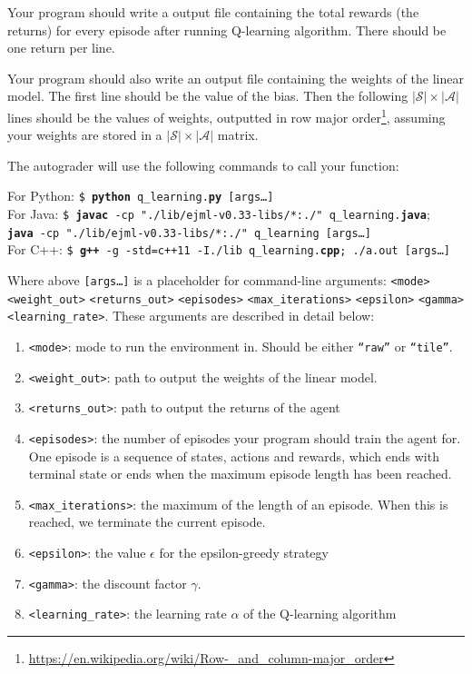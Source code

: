 Your program should write a output file containing the total rewards (the returns) for every episode after running Q-learning algorithm. There should be one return per line.

Your program should also write an output file containing the weights of the linear model. The first line should be the value of the bias. Then the following $|\mathcal{S}| \times |\mathcal{A}|$ lines should be the values of weights, outputted in row major order\footnote{\url{https://en.wikipedia.org/wiki/Row-_and_column-major_order}}, assuming your weights are stored in a $|\mathcal{S}| \times |\mathcal{A}|$ matrix.

The autograder will use the following commands to call your function:

\begin{tabbing}
For Python: \=\texttt{\$ \textbf{python} q\_learning.\textbf{py} [args\dots]}\\
For Java: \>\texttt{\$ \textbf{javac} -cp "./lib/ejml-v0.33-libs/*:./" q\_learning.\textbf{java}};\\ \>  \texttt{\textbf{java} -cp "./lib/ejml-v0.33-libs/*:./" q\_learning [args\dots]}\\
For C++: \>\texttt{\$ \textbf{g++} -g -std=c++11 -I./lib q\_learning.\textbf{cpp}; ./a.out [args\dots]}\\
\end{tabbing}

Where above \texttt{[args\dots]} is a placeholder for command-line arguments: \texttt{<mode>} \texttt{<weight\_out>} \texttt{<returns\_out>} \texttt{<episodes>} \texttt{<max\_iterations>} \texttt{<epsilon>} \texttt{<gamma>} \texttt{<learning\_rate>}. These arguments are described in detail below:
\begin{enumerate}
    \item \texttt{<mode>}: mode to run the environment in. Should be either \texttt{``raw''} or \texttt{``tile''}.
    \item \texttt{<weight\_out>}: path to output the weights of the linear model.
    \item \texttt{<returns\_out>}: path to output the returns of the agent
    \item \texttt{<episodes>}: the number of episodes your program should train the agent for. One episode is a sequence of states, actions and rewards, which ends with terminal state or ends when the maximum episode length has been reached.
    \item \texttt{<max\_iterations>}: the maximum of the length of an episode. When this is reached, we terminate the current episode.
    \item \texttt{<epsilon>}: the value $\epsilon$ for the epsilon-greedy strategy
    \item \texttt{<gamma>}: the discount factor $\gamma$.
    \item \texttt{<learning\_rate>}: the learning rate $\alpha$ of the Q-learning algorithm
\end{enumerate}


